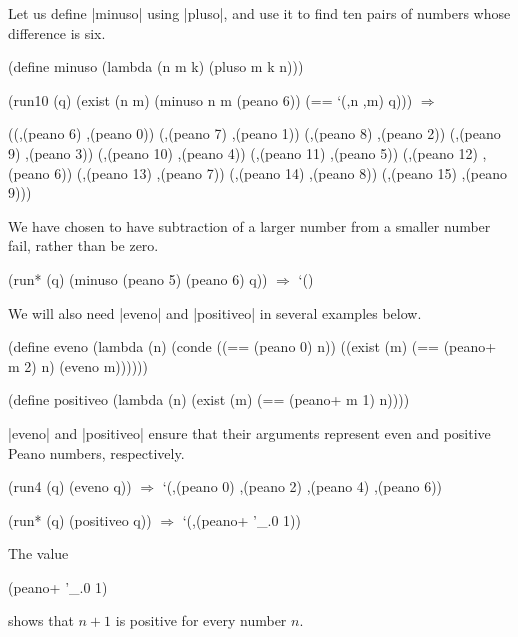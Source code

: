 Let us define \scheme|minuso| using \scheme|pluso|, and use it to find ten pairs of numbers whose difference is six.

\begin{schemedisplay}
(define minuso
  (lambda (n m k)
    (pluso m k n)))

(run10 (q)
  (exist (n m)
    (minuso n m (peano 6))
    (== `(,n ,m) q))) $\Rightarrow$
\end{schemedisplay}
\nspace
\begin{schemeresponse}
((,(peano 6) ,(peano 0))
 (,(peano 7) ,(peano 1))
 (,(peano 8) ,(peano 2))
 (,(peano 9) ,(peano 3))
 (,(peano 10) ,(peano 4))
 (,(peano 11) ,(peano 5))
 (,(peano 12) ,(peano 6))
 (,(peano 13) ,(peano 7))
 (,(peano 14) ,(peano 8))
 (,(peano 15) ,(peano 9)))
\end{schemeresponse}

We have chosen to have subtraction of a larger number from a smaller number
fail, rather than be zero.

\begin{schemedisplay}
(run* (q) (minuso (peano 5) (peano 6) q)) $\Rightarrow$ `()
\end{schemedisplay}

We will also need \scheme|eveno| and \scheme|positiveo| in several examples below. 

\begin{schemedisplay}
(define eveno
  (lambda (n)
    (conde
      ((== (peano 0) n))
      ((exist (m)
         (== (peano+ m 2) n)
         (eveno m))))))

(define positiveo
  (lambda (n)
    (exist (m)
      (== (peano+ m 1) n))))
\end{schemedisplay}

\scheme|eveno| and \scheme|positiveo| ensure that their
arguments represent even and positive Peano numbers, respectively.

\begin{schemedisplay}
(run4 (q) (eveno q)) $\Rightarrow$ `(,(peano 0) ,(peano 2) ,(peano 4) ,(peano 6))

(run* (q) (positiveo q)) $\Rightarrow$ `(,(peano+ '_.0 1))
\end{schemedisplay}

\noindent The value \begin{schemebox}(peano+ '_.0 1)\end{schemebox} shows that
$n + 1$ is positive for every number $n$.

